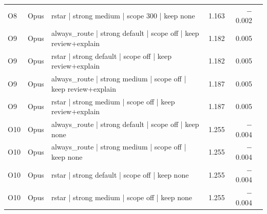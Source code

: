 \begin{xltabular}{\textwidth}{l l >{\raggedright\arraybackslash}X r r c}
O8 & Opus & rstar | strong medium | scope 300 | keep none & 1.163 & $-$0.002 &  \\
O9 & Opus & always\_route | strong default | scope off | keep review+explain & 1.182 & 0.005 &  \\
O9 & Opus & rstar | strong default | scope off | keep review+explain & 1.182 & 0.005 &  \\
O9 & Opus & always\_route | strong medium | scope off | keep review+explain & 1.187 & 0.005 &  \\
O9 & Opus & rstar | strong medium | scope off | keep review+explain & 1.187 & 0.005 &  \\
O10 & Opus & always\_route | strong default | scope off | keep none & 1.255 & $-$0.004 &  \\
O10 & Opus & always\_route | strong medium | scope off | keep none & 1.255 & $-$0.004 &  \\
O10 & Opus & rstar | strong default | scope off | keep none & 1.255 & $-$0.004 &  \\
O10 & Opus & rstar | strong medium | scope off | keep none & 1.255 & $-$0.004 &  \\
\bottomrule
\end{xltabular}
